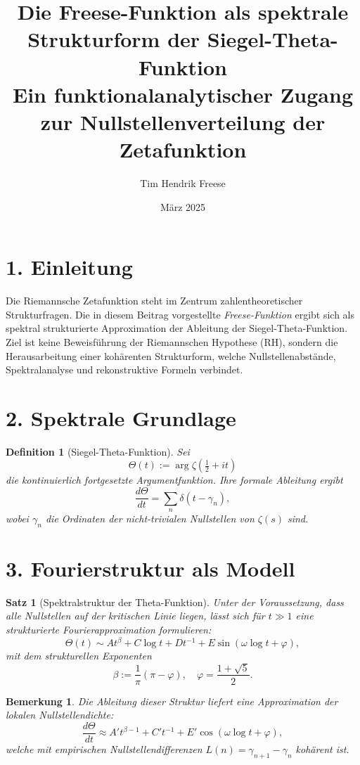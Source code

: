 \documentclass[12pt]{article}
\title{Die Freese-Funktion als spektrale Strukturform der Siegel-Theta-Funktion\\
\large Ein funktionalanalytischer Zugang zur Nullstellenverteilung der Zetafunktion}
\author{Tim Hendrik Freese}
\date{März 2025}
\newtheorem{theorem}{Satz}
\newtheorem{definition}{Definition}
\newtheorem{remark}{Bemerkung}
\begin{document}
\maketitle

\section*{1. Einleitung}

Die Riemannsche Zetafunktion steht im Zentrum zahlentheoretischer Strukturfragen.  
Die in diesem Beitrag vorgestellte \emph{Freese-Funktion} ergibt sich als spektral strukturierte Approximation der Ableitung der Siegel-Theta-Funktion.  
Ziel ist keine Beweisführung der Riemannschen Hypothese (RH), sondern die Herausarbeitung einer kohärenten Strukturform, welche Nullstellenabstände, Spektralanalyse und rekonstruktive Formeln verbindet.

\section*{2. Spektrale Grundlage}

\begin{definition}[Siegel-Theta-Funktion]
Sei
\[
\Theta(t) := \arg \zeta\left( \tfrac{1}{2} + i t \right)
\]
die kontinuierlich fortgesetzte Argumentfunktion. Ihre formale Ableitung ergibt
\[
\frac{d\Theta}{dt} = \sum_n \delta(t - \gamma_n),
\]
wobei \( \gamma_n \) die Ordinaten der nicht-trivialen Nullstellen von \( \zeta(s) \) sind.
\end{definition}

\section*{3. Fourierstruktur als Modell}

\begin{theorem}[Spektralstruktur der Theta-Funktion]
Unter der Voraussetzung, dass alle Nullstellen auf der kritischen Linie liegen, lässt sich für \( t \gg 1 \) eine strukturierte Fourierapproximation formulieren:
\[
\Theta(t) \sim A t^{\beta} + C \log t + D t^{-1} + E \sin(\omega \log t + \varphi),
\]
mit dem strukturellen Exponenten
\[
\beta := \frac{1}{\pi}(\pi - \varphi), \quad \varphi = \frac{1 + \sqrt{5}}{2}.
\]
\end{theorem}

\begin{remark}
Die Ableitung dieser Struktur liefert eine Approximation der lokalen Nullstellendichte:
\[
\frac{d\Theta}{dt} \approx A' t^{\beta - 1} + C' t^{-1} + E' \cos(\omega \log t + \varphi),
\]
welche mit empirischen Nullstellendifferenzen \( L(n) = \gamma_{n+1} - \gamma_n \) kohärent ist.
\end{remark}
\end{document}
